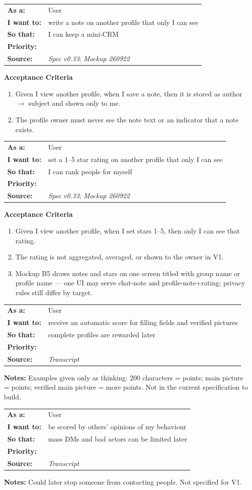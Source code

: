 \documentclass[11pt,a4paper]{article}
\makeatletter
\newcommand{\priPzero}{\colorbox{p0}{\makebox[4.6em]{\textcolor{white}{\scriptsize\bfseries P0 V1}}}}
\newcommand{\priPtwo}{\colorbox{p2}{\makebox[4.6em]{\textcolor{white}{\scriptsize\bfseries P2 Later}}}}
\newcommand{\srcSpec}{\textit{Spec v0.33}}
\newcommand{\srcTx}{\textit{Transcript}}
\newcommand{\srcMock}{\textit{Mockup 260922}}
\newenvironment{story}[1]{%
  \Needspace{10\baselineskip}%
  \vspace{0.7em}%
  \noindent
  \colorbox{navy}{\makebox[\dimexpr\textwidth-2\fboxsep\relax][l]{\textcolor{white}{\bfseries\ #1}}}%
  \par\vspace{0.35em}%
}{\par\vspace{0.55em}}
\newcommand{\storymeta}[5]{%
  \noindent
  \begin{tabularx}{\textwidth}{@{}>{\bfseries}l X@{}}
    As a: & #1 \\
    I want to: & #2 \\
    So that: & #3 \\
    Priority: & #4 \\
    Source: & #5 \\
  \end{tabularx}
  \par\vspace{0.3em}
}
\newcommand{\achead}{\noindent\textbf{Acceptance Criteria}\par}
\newcommand{\notes}[1]{\noindent\textbf{Notes:} #1\par}
\makeatother
\begin{document}
\begin{story}{NOTE-002 --- Private note on another profile}
\storymeta{User}{write a note on another profile that only I can see}{I can keep a mini-CRM}{\priPzero}{\srcSpec; \srcMock}
\achead
\begin{enumerate}
  \item Given I view another profile, when I save a note, then it is stored as author $\rightarrow$ subject and shown only to me.
  \item The profile owner must never see the note text or an indicator that a note exists.
\end{enumerate}
\end{story}

\begin{story}{NOTE-003 --- Private 1--5 star rating}
\storymeta{User}{set a 1--5 star rating on another profile that only I can see}{I can rank people for myself}{\priPzero}{\srcSpec; \srcMock}
\achead
\begin{enumerate}
  \item Given I view another profile, when I set stars 1--5, then only I can see that rating.
  \item The rating is not aggregated, averaged, or shown to the owner in V1.
  \item Mockup B5 draws notes and stars on one screen titled with group name or profile name --- one UI may serve chat-note and profile-note+rating; privacy rules still differ by target.
\end{enumerate}
\end{story}

\begin{story}{NOTE-004 --- Profile completeness score later}
\storymeta{User}{receive an automatic score for filling fields and verified pictures}{complete profiles are rewarded later}{\priPtwo}{\srcTx}
\notes{Examples given only as thinking: 200 characters = points; main picture = points; verified main picture = more points. Not in the current specification to build.}
\end{story}

\begin{story}{NOTE-005 --- Reputation later}
\storymeta{User}{be scored by others' opinions of my behaviour}{mass DMs and bad actors can be limited later}{\priPtwo}{\srcTx}
\notes{Could later stop someone from contacting people. Not specified for V1.}
\end{story}

\newpage
\end{document}
